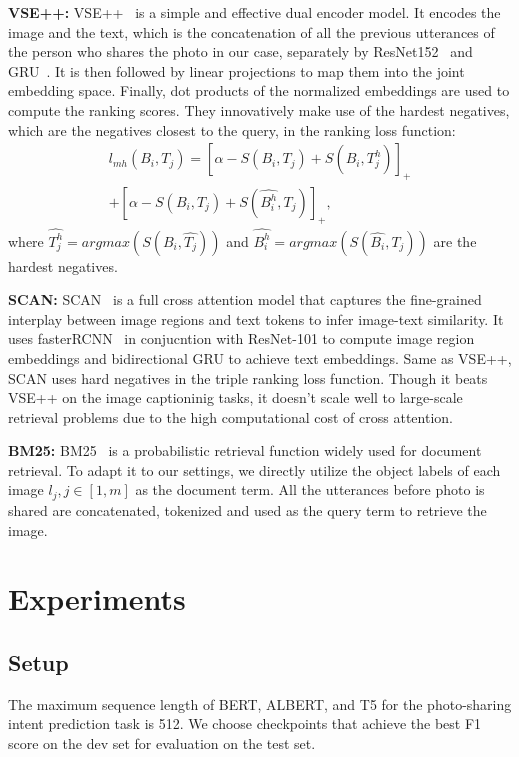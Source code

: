 \documentclass[11pt,a4paper]{article}
\begin{document}
\textbf{VSE++:} VSE++~\cite{faghri2018vse++} is a simple and effective dual encoder model. It encodes the image and the text, which is the concatenation of all the previous utterances of the person who shares the photo in our case, separately by ResNet152~\cite{he2016resnet} and GRU~\cite{cho2014learning}. It is then followed by linear projections to map them into the joint embedding space. Finally, dot products of the normalized embeddings are used to compute the ranking scores. They innovatively make use of the hardest negatives, which are the negatives closest to the query, in the ranking loss function:
\begin{align*}
    l_{mh}(B_i, T_j) = [\alpha - S(B_i, T_j) + S(B_i, \hat{T_{j}^h})]_+ \\ 
+ [\alpha - S(B_i, T_j) + S(\hat{B_{i}^h}, T_j)]_+,
\end{align*}
where $\hat{T_{j}^{h}} = argmax(S(B_i, \hat{T_j}))$ and $\hat{B_i^{h}} = argmax(S(\hat{B_i}, T_j))$ are the hardest negatives.


\textbf{SCAN:} SCAN~\cite{lee2018stacked} is a full cross attention model that captures the fine-grained interplay between image regions and text tokens to infer image-text similarity. 
It uses fasterRCNN~\cite{ren2017fastrcnn} in conjucntion with ResNet-101 to compute image region embeddings and bidirectional GRU to achieve text embeddings. Same as VSE++, SCAN uses hard negatives in the triple ranking loss function. Though it beats VSE++ on the image captioninig tasks, it doesn't scale well to large-scale retrieval problems due to the high computational cost of cross attention.

\textbf{BM25:} BM25~\cite{Amati2009} is a probabilistic retrieval function widely used for document retrieval. To adapt it to our settings, we directly utilize the object labels of each image $l_j, j \in [1, m]$ as the document term. All the utterances before photo is shared are concatenated, tokenized and used as the query term to retrieve the image.

\section{Experiments}

\subsection{Setup}
The maximum sequence length of BERT, ALBERT, and T5 for the photo-sharing intent prediction task is 512. We choose checkpoints that achieve the best F1 score on the dev set for evaluation on the test set.
\end{document}
